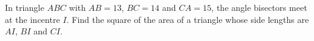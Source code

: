 In triangle $ABC$ with $AB=13$, $BC=14$ and $CA=15$, the angle bisectors meet at the incentre $I$. Find the square of the area of a triangle whose side lengths are $AI$, $BI$ and $CI$.
